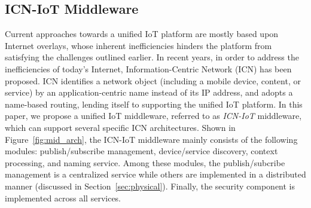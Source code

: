 \subsection{ICN-IoT Middleware}
Current approaches towards a unified IoT platform are mostly based upon Internet overlays, whose inherent inefficiencies hinders the platform from satisfying the challenges outlined earlier. In recent years, in order to address  the inefficiencies of today's Internet, Information-Centric Network (ICN) has been proposed. ICN identifies a network object (including a mobile device, content, or service) by an application-centric name instead of its IP address, and adopts a name-based routing, lending itself to supporting the unified IoT platform. In this paper, we propose a unified IoT middleware, referred to as \emph{ICN-IoT} middleware, which can support several specific ICN architectures. Shown in Figure~\ref{fig:mid_arch}, the ICN-IoT middleware mainly consists of the following modules: publish/subscribe management, device/service discovery, context processing, and naming service. Among these modules, the publish/subcribe management is a centralized service while others are implemented in a distributed manner (discussed in Section~\ref{sec:physical}). Finally, the security component is implemented across all services. 

